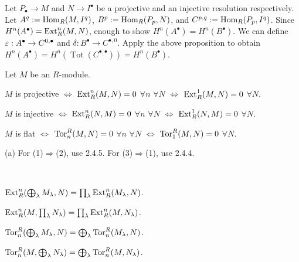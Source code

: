 \documentclass{../../../small}
\DeclareMathOperator{\Tot}{Tot}
\begin{document}
\begin{pf}
Let $P_\bullet\to M$ and $N\to I^\bullet$ be a projective and an injective resolution respectively.
Let $A^q:=\operatorname{Hom}_R(M,I^q)$, $B^p:=\operatorname{Hom}_R(P_p,N)$, and $C^{p,q}:=\operatorname{Hom}_R(P_p,I^q)$.
Since $H^n(A^\bullet)=\operatorname{Ext}_R^n(M,N)$, enough to show $H^n(A^\bullet)=H^n(B^\bullet)$.
We can define $\varepsilon:A^\bullet\to C^{0,\bullet}$ and $\delta:B^\bullet\to C^{\bullet,0}$.
Apply the above proposition to obtain $H^n(A^\bullet)=H^n(\Tot(C^{\bullet,\bullet}))=H^n(B^\bullet)$.
\end{pf}

\begin{prop*}[2.4.6]
Let $M$ be an $R$-module.
\begin{parts}
\item $M$ is projective $\Leftrightarrow$ $\operatorname{Ext}_R^n(M,N)=0$ $\forall n$ $\forall N$ $\Leftrightarrow$ $\operatorname{Ext}_R^1(M,N)=0$ $\forall N$.
\item $M$ is injective $\Leftrightarrow$ $\operatorname{Ext}_R^n(N,M)=0$ $\forall n$ $\forall N$ $\Leftrightarrow$ $\operatorname{Ext}_R^1(N,M)=0$ $\forall N$.
\item $M$ is flat $\Leftrightarrow$ $\operatorname{Tor}^R_n(M,N)=0$ $\forall n$ $\forall N$ $\Leftrightarrow$ $\operatorname{Tor}^R_1(M,N)=0$ $\forall N$.
\end{parts}
\end{prop*}
\begin{pf}
(a) For (1)$\Rightarrow$(2), use 2.4.5. For (3)$\Rightarrow$(1), use 2.4.4.
\end{pf}


\begin{lem*}\,
\begin{parts}
\item $\operatorname{Ext}_R^n(\bigoplus_\lambda M_\lambda,N)=\prod_\lambda\operatorname{Ext}_R^n(M_\lambda,N)$.
\item $\operatorname{Ext}_R^n(M,\prod_\lambda N_\lambda)=\prod_\lambda\operatorname{Ext}_R^n(M,N_\lambda)$.
\item $\operatorname{Tor}^R_n(\bigoplus_\lambda M_\lambda,N)=\bigoplus_\lambda\operatorname{Tor}^R_n(M_\lambda,N)$.
\item $\operatorname{Tor}^R_n(M,\bigoplus_\lambda N_\lambda)=\bigoplus_\lambda\operatorname{Tor}^R_n(M,N_\lambda)$.
\end{parts}
\end{lem*}
\end{document}
